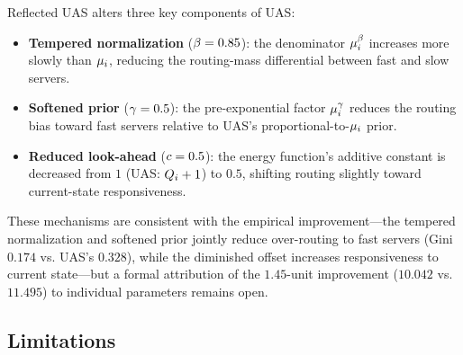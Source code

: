 Reflected UAS alters three key components of UAS:
\begin{itemize}
\item \textbf{Tempered normalization} ($\beta = 0.85$): the denominator $\mu_i^{\beta}$ increases more slowly than $\mu_i$, reducing the routing-mass differential between fast and slow servers.
\item \textbf{Softened prior} ($\gamma = 0.5$): the pre-exponential factor $\mu_i^{\gamma}$ reduces the routing bias toward fast servers relative to UAS's proportional-to-$\mu_i$ prior.
\item \textbf{Reduced look-ahead} ($c = 0.5$): the energy function's additive constant is decreased from $1$ (UAS: $Q_{i}+1$) to $0.5$, shifting routing slightly toward current-state responsiveness.
\end{itemize}
These mechanisms are consistent with the empirical improvement---the tempered normalization and softened prior jointly reduce over-routing to fast servers (Gini $0.174$ vs.
UAS's $0.328$), while the diminished offset increases responsiveness to current state---but a formal attribution of the $1.45$-unit improvement ($10.042$ vs.
$11.495$) to individual parameters remains open.

\subsection{Limitations}

